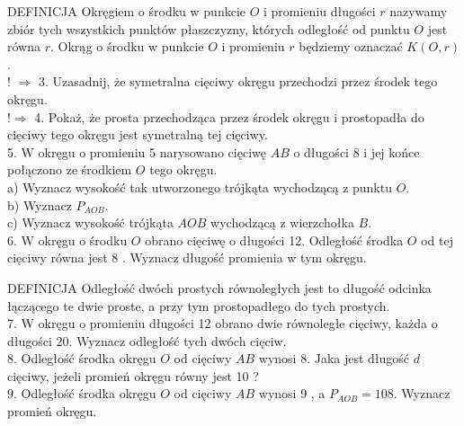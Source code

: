 \documentclass[10pt]{article}
\begin{document}
DEFINICJA Okręgiem o środku w punkcie \(O\) i promieniu długości \(r\) nazywamy zbiór tych wszystkich punktów płaszczyzny, których odległość od punktu \(O\) jest równa \(r\). Okrąg o środku w punkcie \(O\) i promieniu \(r\) będziemy oznaczać \(K(O, r)\).\\
! \(\Rightarrow\) 3. Uzasadnij, że symetralna cięciwy okręgu przechodzi przez środek tego okręgu.\\
\(!\Rightarrow\) 4. Pokaż, że prosta przechodząca przez środek okręgu i prostopadła do cięciwy tego okręgu jest symetralną tej cięciwy.\\
5. W okręgu o promieniu 5 narysowano cięciwę \(A B\) o długości 8 i jej końce połączono ze środkiem \(O\) tego okręgu.\\
a) Wyznacz wysokość tak utworzonego trójkąta wychodzącą z punktu \(O\).\\
b) Wyznacz \(P_{A O B}\).\\
c) Wyznacz wysokość trójkąta \(A O B\) wychodzącą z wierzchołka \(B\).\\
6. W okręgu o środku \(O\) obrano cięciwę o długości 12. Odległość środka \(O\) od tej cięciwy równa jest 8 . Wyznacz długość promienia w tym okręgu.

DEFINICJA Odległość dwóch prostych równoległych jest to długość odcinka łączącego te dwie proste, a przy tym prostopadłego do tych prostych.\\
7. W okręgu o promieniu długości 12 obrano dwie równoległe cięciwy, każda o długości 20. Wyznacz odległość tych dwóch cięciw.\\
8. Odległość środka okręgu \(O\) od cięciwy \(A B\) wynosi 8. Jaka jest długość \(d\) cięciwy, jeżeli promień okręgu równy jest 10 ?\\
9. Odległość środka okręgu \(O\) od cięciwy \(A B\) wynosi 9 , a \(P_{A O B}=108\). Wyznacz promień okręgu.
\end{document}
